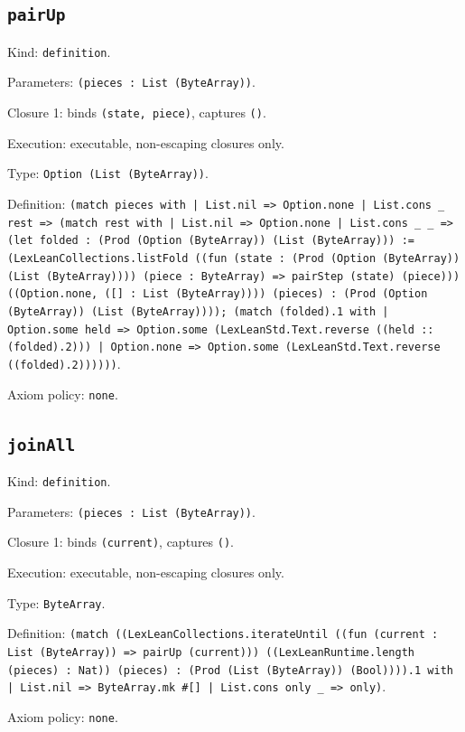 \documentclass[11pt]{article}
\begin{document}
\subsection*{\texttt{pairUp}}
\noindent Kind: \texttt{definition}.\par
\noindent Parameters: \texttt{(pieces : List (ByteArray))}.\par
\noindent Closure 1: binds \texttt{(state, piece)}, captures \texttt{()}.\par
\noindent Execution: executable, non-escaping closures only.\par
\noindent Type: \texttt{Option (List (ByteArray))}.\par
\noindent Definition: \texttt{(match pieces with | List.nil => Option.none | List.cons \_ rest => (match rest with | List.nil => Option.none | List.cons \_ \_ => (let folded : (Prod (Option (ByteArray)) (List (ByteArray))) := (LexLeanCollections.listFold ((fun (state : (Prod (Option (ByteArray)) (List (ByteArray)))) (piece : ByteArray) => pairStep (state) (piece))) ((Option.none, ([] : List (ByteArray)))) (pieces) : (Prod (Option (ByteArray)) (List (ByteArray)))); (match (folded).1 with | Option.some held => Option.some (LexLeanStd.Text.reverse ((held :: (folded).2))) | Option.none => Option.some (LexLeanStd.Text.reverse ((folded).2))))))}.\par
\noindent Axiom policy: \texttt{none}.\par
\subsection*{\texttt{joinAll}}
\noindent Kind: \texttt{definition}.\par
\noindent Parameters: \texttt{(pieces : List (ByteArray))}.\par
\noindent Closure 1: binds \texttt{(current)}, captures \texttt{()}.\par
\noindent Execution: executable, non-escaping closures only.\par
\noindent Type: \texttt{ByteArray}.\par
\noindent Definition: \texttt{(match ((LexLeanCollections.iterateUntil ((fun (current : List (ByteArray)) => pairUp (current))) ((LexLeanRuntime.length (pieces) : Nat)) (pieces) : (Prod (List (ByteArray)) (Bool)))).1 with | List.nil => ByteArray.mk \#[] | List.cons only \_ => only)}.\par
\noindent Axiom policy: \texttt{none}.\par
\end{document}
